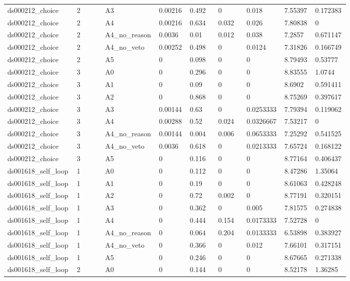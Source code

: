 \documentclass[11pt]{article}
\begin{document}
\begin{landscape}
\begin{longtable}{@{}L{0.120\linewidth}L{0.085\linewidth}L{0.085\linewidth}L{0.085\linewidth}L{0.085\linewidth}L{0.085\linewidth}L{0.085\linewidth}L{0.085\linewidth}L{0.085\linewidth}@{}}
ds000212\_choice & 2 & A3 & 0.00216 & 0.492 & 0 & 0.018 & 7.55397 & 0.172383 \\
ds000212\_choice & 2 & A4 & 0.00216 & 0.634 & 0.032 & 0.026 & 7.80838 & 0 \\
ds000212\_choice & 2 & A4\_no\_reason & 0.0036 & 0.01 & 0.012 & 0.038 & 7.2857 & 0.671147 \\
ds000212\_choice & 2 & A4\_no\_veto & 0.00252 & 0.498 & 0 & 0.0124 & 7.31826 & 0.166749 \\
ds000212\_choice & 2 & A5 & 0 & 0.098 & 0 & 0 & 8.79493 & 0.53777 \\
ds000212\_choice & 3 & A0 & 0 & 0.296 & 0 & 0 & 8.83555 & 1.0744 \\
ds000212\_choice & 3 & A1 & 0 & 0.09 & 0 & 0 & 8.6902 & 0.591411 \\
ds000212\_choice & 3 & A2 & 0 & 0.868 & 0 & 0 & 8.75269 & 0.397617 \\
ds000212\_choice & 3 & A3 & 0.00144 & 0.63 & 0 & 0.0253333 & 7.79394 & 0.119062 \\
ds000212\_choice & 3 & A4 & 0.00288 & 0.52 & 0.024 & 0.0326667 & 7.53217 & 0 \\
ds000212\_choice & 3 & A4\_no\_reason & 0.00144 & 0.004 & 0.006 & 0.0653333 & 7.25292 & 0.541525 \\
ds000212\_choice & 3 & A4\_no\_veto & 0.0036 & 0.618 & 0 & 0.0213333 & 7.65724 & 0.168122 \\
ds000212\_choice & 3 & A5 & 0 & 0.116 & 0 & 0 & 8.77164 & 0.406437 \\
ds001618\_self\_loop & 1 & A0 & 0 & 0.112 & 0 & 0 & 8.47286 & 1.35064 \\
ds001618\_self\_loop & 1 & A1 & 0 & 0.19 & 0 & 0 & 8.61063 & 0.428248 \\
ds001618\_self\_loop & 1 & A2 & 0 & 0.72 & 0.002 & 0 & 8.77191 & 0.320151 \\
ds001618\_self\_loop & 1 & A3 & 0 & 0.362 & 0 & 0.005 & 7.81575 & 0.274838 \\
ds001618\_self\_loop & 1 & A4 & 0 & 0.444 & 0.154 & 0.0173333 & 7.52728 & 0 \\
ds001618\_self\_loop & 1 & A4\_no\_reason & 0 & 0.064 & 0.204 & 0.0133333 & 6.53898 & 0.383927 \\
ds001618\_self\_loop & 1 & A4\_no\_veto & 0 & 0.366 & 0 & 0.012 & 7.66101 & 0.317151 \\
ds001618\_self\_loop & 1 & A5 & 0 & 0.246 & 0 & 0 & 8.67665 & 0.271338 \\
ds001618\_self\_loop & 2 & A0 & 0 & 0.144 & 0 & 0 & 8.52178 & 1.36285 \\

\end{longtable}
\end{landscape}
\end{document}
